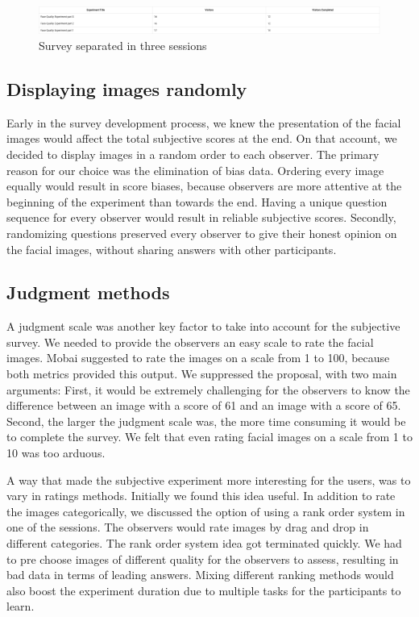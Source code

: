 \begin{figure}[h]
    \centering
    \includegraphics[scale = 0.2]{figures/three-sessions.png}
    \caption{Survey separated in three sessions}
    \label{fig:three-sessions}
\end{figure}

\newpage 

\subsection*{Displaying images randomly}
Early in the survey development process, we knew the presentation of the facial images would affect the total subjective scores at the end. On that account, we decided to display images in a random order to each observer. The primary reason for our choice was the elimination of bias data. Ordering every image equally would result in score biases, because observers are more attentive at the beginning of the experiment than towards the end. Having a unique question sequence for every observer would result in reliable subjective scores. 
Secondly, randomizing questions preserved every observer to give their honest opinion on the facial images, without sharing answers with other participants.

\subsection*{Judgment methods}
A judgment scale was another key factor to take into account for the subjective survey. We needed to provide the observers an easy scale to rate the facial images. Mobai suggested to rate the images on a scale from 1 to 100, because both metrics provided this output. We suppressed the proposal, with two main arguments: First, it would be extremely challenging for the observers to know the difference between an image with a score of 61 and an image with a score of 65. Second, the larger the judgment scale was, the more time consuming it would be to complete the survey. We felt that even rating facial images on a scale from 1 to 10 was too arduous. 

A way that made the subjective experiment more interesting for the users, was to vary in ratings methods. Initially we found this idea useful. In addition to rate the images categorically, we discussed the option of using a rank order system in one of the sessions. The observers would rate images by drag and drop in different categories. The rank order system idea got terminated quickly. We had to pre choose images of different quality for the observers to assess, resulting in bad data in terms of leading answers. Mixing different ranking methods would also boost the experiment duration due to multiple tasks for the participants to learn. 

